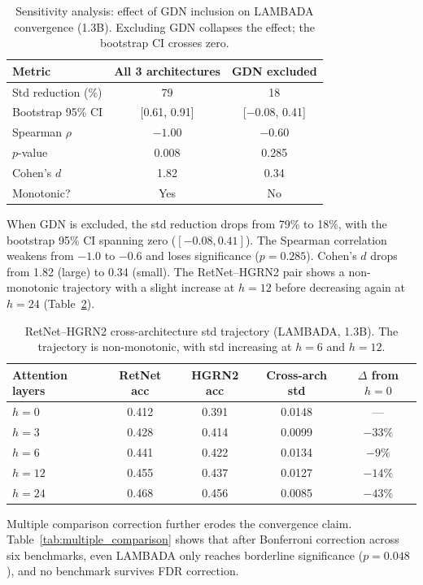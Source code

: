 \documentclass[11pt]{article}
\begin{document}
\begin{table}[t]
\centering
\caption{Sensitivity analysis: effect of GDN inclusion on LAMBADA convergence (1.3B). Excluding GDN collapses the effect; the bootstrap CI crosses zero.}
\label{tab:sensitivity}
\begin{tabular}{lcc}
\toprule
Metric & All 3 architectures & GDN excluded \\
\midrule
Std reduction (\%) & 79 & 18 \\
Bootstrap 95\% CI & [0.61, 0.91] & [$-0.08$, 0.41] \\
Spearman $\rho$ & $-1.00$ & $-0.60$ \\
$p$-value & 0.008 & 0.285 \\
Cohen's $d$ & 1.82 & 0.34 \\
Monotonic? & Yes & No \\
\bottomrule
\end{tabular}
\end{table}

When GDN is excluded, the std reduction drops from 79\% to 18\%, with the bootstrap 95\% CI spanning zero ($[-0.08, 0.41]$). The Spearman correlation weakens from $-1.0$ to $-0.6$ and loses significance ($p = 0.285$). Cohen's $d$ drops from 1.82 (large) to 0.34 (small). The RetNet--HGRN2 pair shows a non-monotonic trajectory with a slight increase at $h = 12$ before decreasing again at $h = 24$ (Table~\ref{tab:retnet_hgrn2_trajectory}).

\begin{table}[t]
\centering
\caption{RetNet--HGRN2 cross-architecture std trajectory (LAMBADA, 1.3B). The trajectory is non-monotonic, with std increasing at $h = 6$ and $h = 12$.}
\label{tab:retnet_hgrn2_trajectory}
\begin{tabular}{lcccc}
\toprule
Attention layers & RetNet acc & HGRN2 acc & Cross-arch std & $\Delta$ from $h=0$ \\
\midrule
$h = 0$  & 0.412 & 0.391 & 0.0148 & --- \\
$h = 3$  & 0.428 & 0.414 & 0.0099 & $-33\%$ \\
$h = 6$  & 0.441 & 0.422 & 0.0134 & $-9\%$ \\
$h = 12$ & 0.455 & 0.437 & 0.0127 & $-14\%$ \\
$h = 24$ & 0.468 & 0.456 & 0.0085 & $-43\%$ \\
\bottomrule
\end{tabular}
\end{table}

Multiple comparison correction further erodes the convergence claim. Table~\ref{tab:multiple_comparison} shows that after Bonferroni correction across six benchmarks, even LAMBADA only reaches borderline significance ($p = 0.048$), and no benchmark survives FDR correction.
\end{document}

